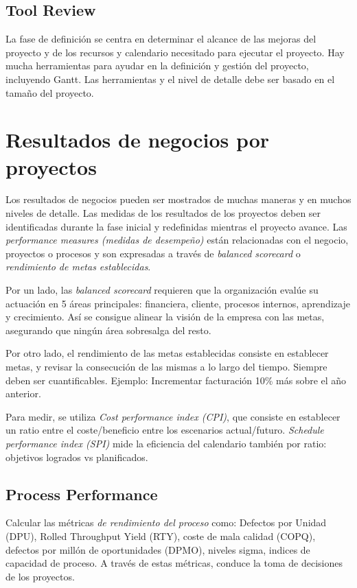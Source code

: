 \documentclass[oneside]{book}
\begin{document}
\section{Tool Review}

La fase de definición se centra en determinar el alcance de las mejoras del proyecto y de los recursos y calendario necesitado para ejecutar el proyecto. Hay mucha herramientas para ayudar en la definición y gestión del proyecto, incluyendo Gantt. Las herramientas y el nivel de detalle debe ser basado en el tamaño del proyecto.

\chapter{Resultados de negocios por proyectos}

Los resultados de negocios pueden ser mostrados de muchas maneras y en muchos niveles de detalle. Las medidas de los resultados de los proyectos deben ser identificadas durante la fase inicial y redefinidas mientras el proyecto avance. Las \textit{performance measures (medidas de desempeño)} están relacionadas con el negocio, proyectos o procesos y son expresadas a través de \textit{balanced scorecard} o \textit{rendimiento de metas establecidas}.

Por un lado, las \textit{balanced scorecard} requieren que la organización evalúe su actuación en 5 áreas principales: financiera, cliente, procesos internos, aprendizaje y crecimiento. Así se consigue alinear la visión de la empresa con las metas, asegurando que ningún área sobresalga del resto.

Por otro lado, el rendimiento de las metas establecidas consiste en establecer metas, y revisar la consecución de las mismas a lo largo del tiempo. Siempre deben ser cuantificables. Ejemplo: Incrementar facturación 10\% más sobre el año anterior.

Para medir, se utiliza \textit{Cost performance index (CPI)}, que consiste en establecer un ratio entre el coste/beneficio entre los escenarios actual/futuro. \textit{Schedule performance index (SPI)} mide la eficiencia del calendario también por ratio: objetivos logrados vs planificados.
	
\section{Process Performance}

Calcular las métricas \textit{de rendimiento del proceso} como: Defectos por Unidad (DPU), Rolled Throughput Yield (RTY), coste de mala calidad (COPQ), defectos por millón de oportunidades (DPMO), niveles sigma, indices de capacidad de proceso. A través de estas métricas, conduce la toma de decisiones de los proyectos.
\end{document}

